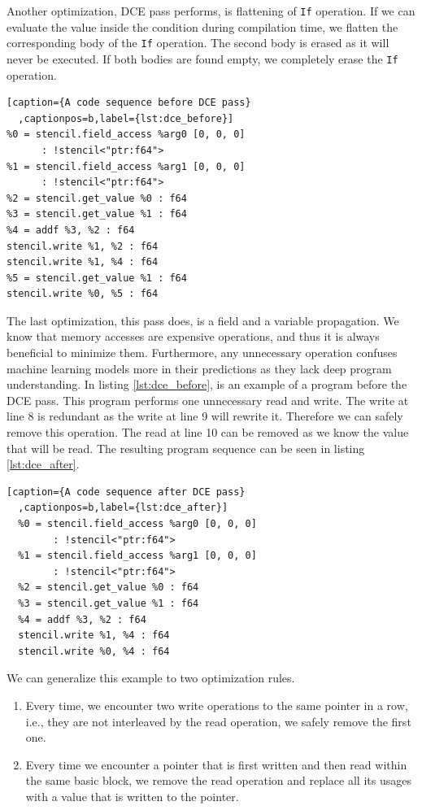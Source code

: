 \documentclass[sigplan,\review anonymous]{acmart}
\begin{document}
Another optimization, DCE pass performs, is flattening of \texttt{If}
operation. If we can evaluate the value inside the condition during
compilation time, we flatten the corresponding body of the \texttt{If}
operation. The second body is erased as it will never be executed.
If both bodies are found empty, we completely erase the \texttt{If} operation.

\begin{lstlisting}[caption={A code sequence before DCE pass}
  ,captionpos=b,label={lst:dce_before}] 
%0 = stencil.field_access %arg0 [0, 0, 0]
      : !stencil<"ptr:f64">
%1 = stencil.field_access %arg1 [0, 0, 0]
      : !stencil<"ptr:f64">
%2 = stencil.get_value %0 : f64
%3 = stencil.get_value %1 : f64
%4 = addf %3, %2 : f64
stencil.write %1, %2 : f64
stencil.write %1, %4 : f64
%5 = stencil.get_value %1 : f64
stencil.write %0, %5 : f64
\end{lstlisting}

The last optimization, this pass does, is a field and a variable propagation.
We know that memory accesses are expensive operations, and thus it is always
beneficial to minimize them. Furthermore, any unnecessary operation confuses
machine learning models more in their predictions as they lack deep program
understanding. In listing \ref{lst:dce_before}, is an example of a program
before the DCE pass. This program performs one unnecessary read and write.
The write at line 8 is redundant as the write at line 9 will rewrite it.
Therefore we can safely remove this operation. The read at line 10 can be
removed as we know the value that will be read. The resulting program sequence
can be seen in listing \ref{lst:dce_after}.

\begin{lstlisting}[caption={A code sequence after DCE pass}
  ,captionpos=b,label={lst:dce_after}] 
  %0 = stencil.field_access %arg0 [0, 0, 0]
        : !stencil<"ptr:f64">
  %1 = stencil.field_access %arg1 [0, 0, 0]
        : !stencil<"ptr:f64">
  %2 = stencil.get_value %0 : f64
  %3 = stencil.get_value %1 : f64
  %4 = addf %3, %2 : f64
  stencil.write %1, %4 : f64
  stencil.write %0, %4 : f64
\end{lstlisting}

We can generalize this example to two optimization rules.
\begin{enumerate}
  \item Every time, we encounter two write operations to the same pointer in
  a row, i.e., they are not interleaved by the read operation, we safely
  remove the first one. 
  \item Every time we encounter a pointer that is first written and
  then read within the same basic block, we remove the read operation and
  replace all its usages with a value that is written to the pointer.
\end{enumerate}
\end{document}
